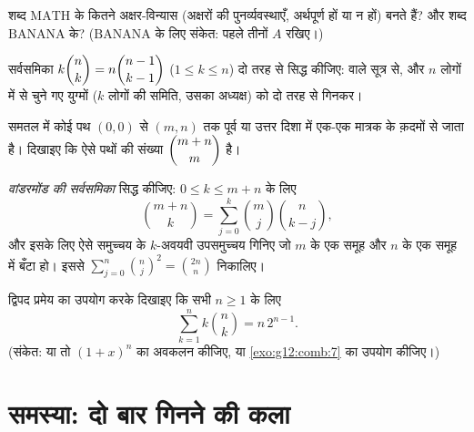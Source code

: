 \begin{exercise}[$\star\star$]\label{exo:g12:comb:6}
शब्द $\mathrm{MATH}$ के कितने अक्षर-विन्यास (अक्षरों की पुनर्व्यवस्थाएँ,
अर्थपूर्ण हों या न हों) बनते हैं? और शब्द $\mathrm{BANANA}$ के? ($\mathrm{BANANA}$
के लिए संकेत: पहले तीनों $A$ रखिए।)
\end{exercise}

\begin{exercise}[$\star\star$]\label{exo:g12:comb:7}
सर्वसमिका $k\dbinom{n}{k} = n\dbinom{n-1}{k-1}$ ($1 \leq k \leq n$) दो तरह से सिद्ध कीजिए:  वाले सूत्र से, और
$n$ लोगों में से चुने गए युग्मों ($k$ लोगों की समिति, उसका अध्यक्ष) को दो
तरह से गिनकर।
\end{exercise}

\begin{exercise}[$\star\star$]\label{exo:g12:comb:8}
समतल में कोई पथ $(0,0)$ से $(m, n)$ तक पूर्व या उत्तर दिशा में एक-एक मात्रक के
क़दमों से जाता है। दिखाइए कि ऐसे पथों की संख्या $\dbinom{m+n}{m}$ है।
\end{exercise}

\begin{exercise}[$\star\star\star$]\label{exo:g12:comb:9}
\emph{वांडरमोंड की सर्वसमिका} सिद्ध कीजिए: $0 \leq k \leq m + n$ के लिए
\[
\binom{m+n}{k} = \sum_{j=0}^{k} \binom{m}{j}\binom{n}{k-j},
\]
और इसके लिए ऐसे समुच्चय के $k$-अवयवी उपसमुच्चय गिनिए जो $m$ के एक समूह
और $n$ के एक समूह में बँटा हो। इससे $\displaystyle\sum_{j=0}^{n}\binom{n}{j}^{\!2} = \binom{2n}{n}$ निकालिए।
\end{exercise}

\begin{exercise}[$\star\star\star$]\label{exo:g12:comb:10}
द्विपद प्रमेय का उपयोग करके दिखाइए कि सभी $n \geq 1$ के लिए
\[
\sum_{k=1}^{n} k \binom{n}{k} = n\,2^{n-1}.
\]
(संकेत: या तो $(1+x)^n$ का अवकलन कीजिए, या \cref{exo:g12:comb:7} का उपयोग कीजिए।)
\end{exercise}

\section{समस्या: दो बार गिनने की कला}

